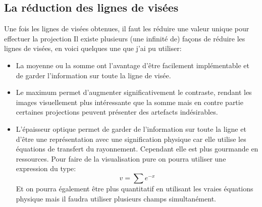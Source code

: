 \subsection{La réduction des lignes de visées}

Une fois les lignes de visées obtenues, il faut les réduire une valeur unique pour effectuer la projection
Il existe plusieurs (une infinité de) façons de réduire les lignes de visées, en voici quelques une que j'ai pu utiliser:

\begin{itemize}
\item La moyenne ou la somme ont l'avantage d'être facilement implémentable et de garder l'information sur toute la ligne de visée.

\item Le maximum permet d'augmenter significativement le contraste, rendant les images visuellement plus intéressante que la somme mais en contre partie certaines projections peuvent présenter des artefacts indésirables.

\item L'épaisseur optique permet de garder de l'information sur toute la ligne et d'être une représentation avec une signification physique car elle utilise les équations de transfert du rayonnement.
Cependant elle est plus gourmande en ressources.
Pour faire de la visualisation pure on pourra utiliser une expression du type:
\begin{equation}
v= \sum e^{-x}
\end{equation}
Et on pourra également être plus quantitatif en utilisant les vraies équations physique mais il faudra utiliser plusieurs champs simultanément. %
\end{itemize}




